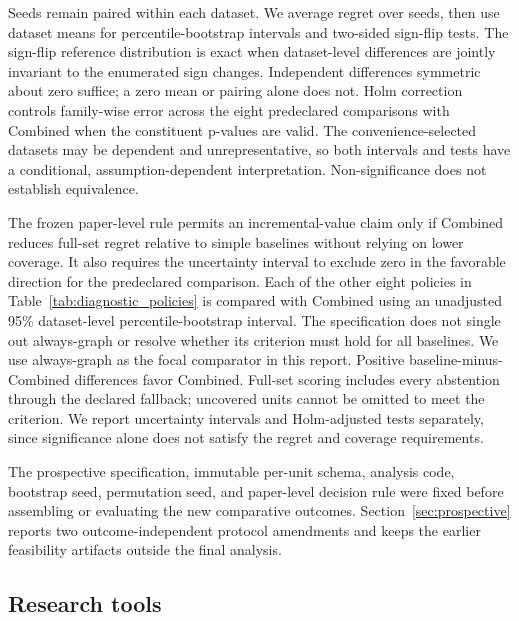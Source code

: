 Seeds remain paired within each dataset. We average regret over seeds, then use dataset means for percentile-bootstrap intervals and two-sided sign-flip tests. The sign-flip reference distribution is exact when dataset-level differences are jointly invariant to the enumerated sign changes. Independent differences symmetric about zero suffice; a zero mean or pairing alone does not. Holm correction controls family-wise error across the eight predeclared comparisons with Combined when the constituent p-values are valid. The convenience-selected datasets may be dependent and unrepresentative, so both intervals and tests have a conditional, assumption-dependent interpretation. Non-significance does not establish equivalence.

The frozen paper-level rule permits an incremental-value claim only if Combined reduces full-set regret relative to simple baselines without relying on lower coverage. It also requires the uncertainty interval to exclude zero in the favorable direction for the predeclared comparison. Each of the other eight policies in Table~\ref{tab:diagnostic_policies} is compared with Combined using an unadjusted 95\% dataset-level percentile-bootstrap interval. The specification does not single out always-graph or resolve whether its criterion must hold for all baselines. We use always-graph as the focal comparator in this report. Positive baseline-minus-Combined differences favor Combined. Full-set scoring includes every abstention through the declared fallback; uncovered units cannot be omitted to meet the criterion. We report uncertainty intervals and Holm-adjusted tests separately, since significance alone does not satisfy the regret and coverage requirements.

The prospective specification, immutable per-unit schema, analysis code, bootstrap seed, permutation seed, and paper-level decision rule were fixed before assembling or evaluating the new comparative outcomes. Section~\ref{sec:prospective} reports two outcome-independent protocol amendments and keeps the earlier feasibility artifacts outside the final analysis.



\subsection{Research tools}
\label{sec:research_tools}

